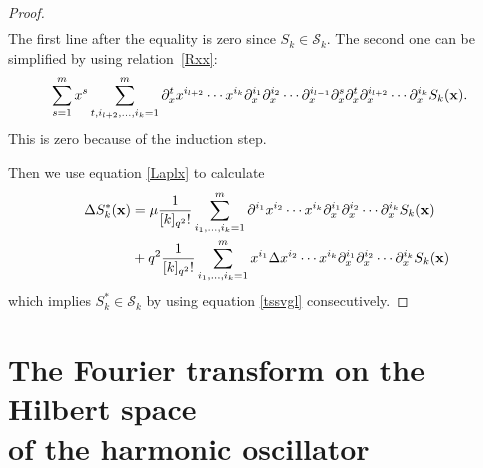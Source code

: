 \documentclass[pdftex]{sigma}
\newcommand{\cS}{\mathcal{S}}
\numberwithin{equation}{section}
\begin{document}
\begin{proof}
\begin{gather*}
\end{gather*}
The f\/irst line after the equality is zero since $S_k\in\cS_k$. The second one can be simplif\/ied by using relation~\eqref{Rxx}:
\begin{gather*}
\sum_{s=1}^mx^s\sum_{t,i_{l+2},\dots,i_k=1}^m\partial^{t}_x x^{i_{l+2}}\cdots x^{i_k}\partial^{i_1}_x\partial^{i_2}_x\cdots\partial^{i_{l-1}}_x\partial^{s}_x\partial^{t}_x\partial^{i_{l+2}}_x\cdots\partial^{i_{k}}_xS_k(\bold{x}).
\end{gather*}
This is zero because of the induction step.

Then we use equation \eqref{Laplx} to calculate
\begin{gather*}
\Delta S_k^\ast(\bold{x}) = \mu\frac{1}{[k]_{q^2}!}\sum_{i_1,\dots,i_k=1}^{m}\partial^{i_1}x^{i_2}\cdots x^{i_k}\partial^{i_1}_x\partial^{i_2}_x\cdots\partial^{i_k}_xS_k(\bold{x})\\
\phantom{\Delta S_k^\ast(\bold{x}) =}{} + q^2\frac{1}{[k]_{q^2}!}\sum_{i_1,\dots,i_k=1}^{m}x^{i_1}\Delta x^{i_2}\cdots x^{i_k}\partial^{i_1}_x\partial^{i_2}_x\cdots\partial^{i_k}_xS_k(\bold{x})
\end{gather*}
which implies $S_k^\ast\in\cS_k$ by using equation \eqref{tssvgl} consecutively.
\end{proof}


\section{The Fourier transform on the Hilbert space\\ of the harmonic oscillator}\label{FourHO}
\end{document}
